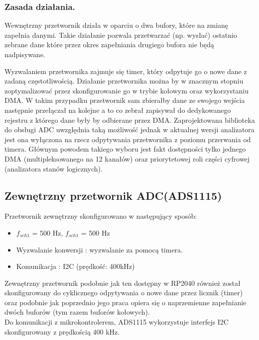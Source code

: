 \subsubsection{Zasada działania.}
    Wewnętrzny przetwornik działa w oparciu o dwa bufory, które na zmianę zapełnia danymi. Takie 
    działanie pozwala przetwarzać (np. wysłać) ostatnio zebrane dane które przez okres 
    zapełniania drugiego bufora nie będą nadpisywane.

    Wyzwalaniem przetwornika zajmuje się timer, który odpytuje go o nowe dane z zadaną częstotliwością.
    Działanie przetwornika można by w znacznym stopniu zoptymalizować przez skonfigurowanie go w trybie kołowym oraz wykorzystaniu DMA. 
    W takim przypadku przetwornik sam zbierałby dane ze swojego wejścia następnie przełączał na kolejne a to co zebrał zapisywał do dedykowanego rejestru z którego dane były by odbierane przez DMA.
    Zaprojektowana biblioteka do obsługi ADC uwzględnia taką możliwość jednak w aktualnej wersji analizatora jest ona wyłączona na rzecz odpytywania przetwornika z poziomu przerwania od timera. 
    Głównym powodem takiego wyboru jest fakt dostępności tylko jednego DMA (multipleksowanego na 12 kanałów) oraz priorytetowej roli części cyfrowej (analizatora stanów logicznych).


\subsection{Zewnętrzny przetwornik ADC(ADS1115)}
Przetwornik zewnętrzny skonfigurowano w następujący sposób:
\begin{itemize}
    \item $f_{sch1}$ = 500 Hz, $f_{sch1}$ = 500 Hz
    \item Wyzwalanie konwersji : wyzwalanie za pomocą timera. 
    \item Komunikacja : I2C (prędkość: 400kHz)
\end{itemize}

Zewnętrzny przetwornik podobnie jak ten dostępny w RP2040 również został skonfigurowany do cyklicznego odpytywania o nowe dane przez licznik (timer) oraz podobnie jak poprzednio jego praca opiera się o naprzemienne zapełnianie dwóch buforów (tym razem buforów kołowych). \\
Do komunikacji z mikrokontrolerem, ADS1115 wykorzystuje interfejs I2C skonfigurowany z prędkością 400 kHz.

